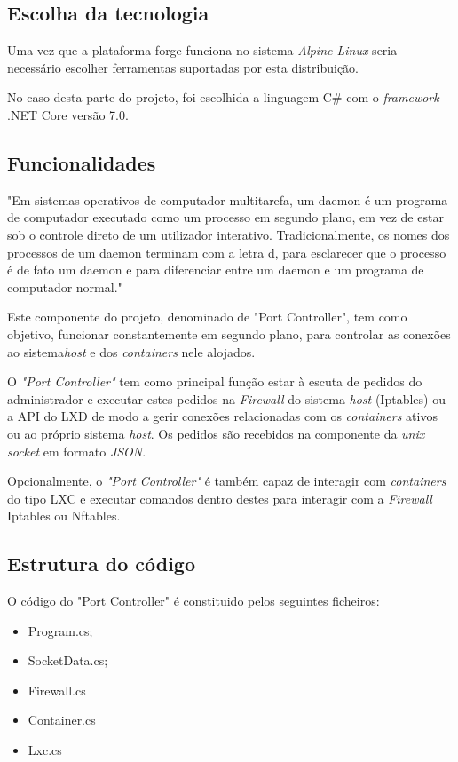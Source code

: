\subsection{Escolha da tecnologia}

Uma vez que a plataforma forge funciona no sistema \textit{Alpine Linux} seria
necessário escolher ferramentas suportadas por esta distribuição.

No caso desta parte do projeto, foi escolhida a linguagem C\# com o 
\textit{framework} .NET Core versão 7.0.



\subsection{Funcionalidades}

"Em sistemas operativos de computador multitarefa, um daemon é um programa de 
computador executado como um processo em segundo plano, em vez de estar sob o 
controle direto de um utilizador interativo. Tradicionalmente, os nomes dos processos
de um daemon terminam com a letra d, para esclarecer que o processo é de fato um 
daemon e para diferenciar entre um daemon e um programa de computador normal." \cite{daemon}

Este componente do projeto, denominado de "Port Controller", tem como objetivo,
funcionar constantemente em segundo plano, para controlar as conexões ao
sistema\textit{host} e dos \textit{containers} nele alojados.

O \textit{"Port Controller"} tem como principal função estar à escuta de pedidos
do administrador e executar estes pedidos na \textit{Firewall} do sistema
\textit{host} (Iptables) ou a API do LXD de modo a gerir conexões relacionadas 
com os \textit{containers} ativos ou ao próprio sistema \textit{host}.
Os pedidos são recebidos na componente da \textit{unix socket} em formato
\textit{JSON}.


Opcionalmente, o \textit{"Port Controller"} é também capaz de interagir com \textit{containers}
do tipo LXC e executar comandos dentro destes para interagir com a
\textit{Firewall} Iptables ou Nftables.

\subsection{Estrutura do código}

O código do "Port Controller" é constituido pelos seguintes ficheiros:

\begin{itemize}
    \item Program.cs;
    \item SocketData.cs;
    \item Firewall.cs
    \item Container.cs
    \item Lxc.cs

\end{itemize}


